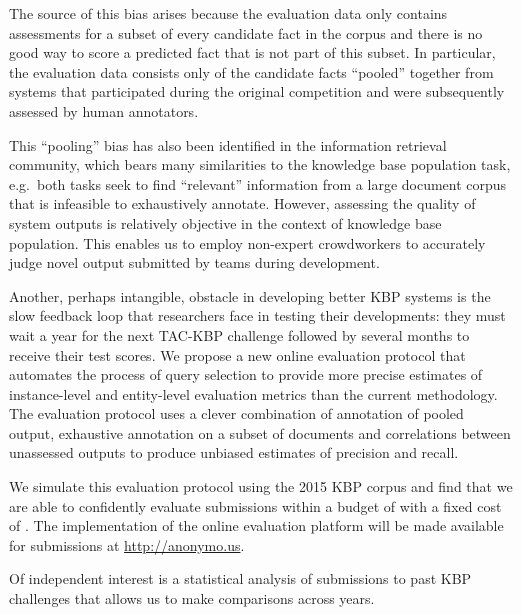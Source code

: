 The source of this bias arises because 
the evaluation data only contains assessments for a subset of every candidate fact in the corpus
and there is no good way to score a predicted fact that is not part of this subset.
In particular, the evaluation data consists only of the candidate facts ``pooled'' together from systems that participated during the original competition and were subsequently assessed by human annotators.

This ``pooling'' bias has also been identified in the information retrieval community\needcite, which bears many similarities to the knowledge base population task, e.g.\ both tasks seek to find ``relevant'' information from a large document corpus that is infeasible to exhaustively annotate.
However, assessing the quality of system outputs is relatively objective in the context of knowledge base population.
This enables us to employ non-expert crowdworkers to accurately judge novel output submitted by teams during development.

Another, perhaps intangible, obstacle in developing better KBP systems is the slow feedback loop that researchers face in testing their developments: they must wait a year for the next TAC-KBP challenge followed by several months to receive their test scores.
We propose a new online evaluation protocol that automates the process of query selection to provide more precise estimates of instance-level and entity-level evaluation metrics than the current methodology.
The evaluation protocol uses a clever combination of annotation of pooled output, exhaustive annotation on a subset of documents and correlations between unassessed outputs to produce unbiased estimates of precision and recall.

We simulate this evaluation protocol using the 2015 KBP corpus and find that we are able to confidently evaluate submissions within a budget of  with a fixed cost of .
The implementation of the online evaluation platform will be made available for submissions at \url{http://anonymo.us}.

Of independent interest is a statistical analysis of submissions to past KBP challenges that allows us to make comparisons across years.



